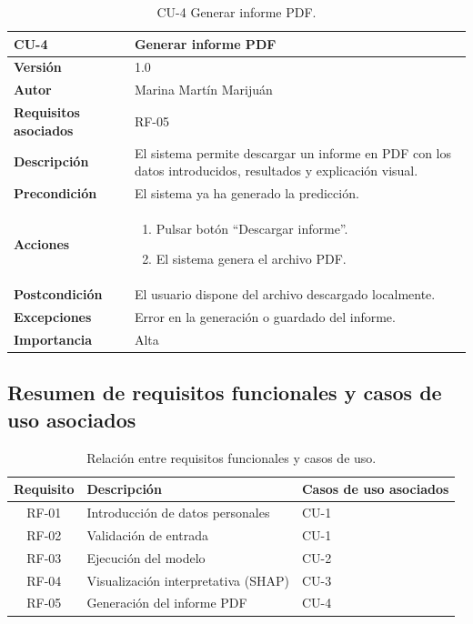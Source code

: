 \begin{table}[!htbp]
	\centering
	\begin{tabularx}{\linewidth}{ p{} p{} }
		\toprule
		\textbf{CU-4}    & Generar informe PDF \\
		\toprule
		\textbf{Versión}              & 1.0    \\
		\textbf{Autor}                & Marina Martín Marijuán \\
		\textbf{Requisitos asociados} & RF-05 \\
		\textbf{Descripción}          & El sistema permite descargar un informe en PDF con los datos introducidos, resultados y explicación visual. \\
		\textbf{Precondición}         & El sistema ya ha generado la predicción. \\
		\textbf{Acciones}             &
		\begin{enumerate}
			\item Pulsar botón “Descargar informe”.
			\item El sistema genera el archivo PDF.
		\end{enumerate}\\
		\textbf{Postcondición}        & El usuario dispone del archivo descargado localmente. \\
		\textbf{Excepciones}          & Error en la generación o guardado del informe. \\
		\textbf{Importancia}          & Alta \\
		\bottomrule
	\end{tabularx}
	\caption{CU-4 Generar informe PDF.}
\end{table}

\clearpage
\subsection{Resumen de requisitos funcionales y casos de uso asociados}

\begin{table}[H]
\centering
\begin{tabular}{|c|l|l|}
\hline
\textbf{Requisito} & \textbf{Descripción} & \textbf{Casos de uso asociados} \\
\hline
RF-01 & Introducción de datos personales & CU-1 \\
RF-02 & Validación de entrada & CU-1 \\
RF-03 & Ejecución del modelo & CU-2 \\
RF-04 & Visualización interpretativa (SHAP) & CU-3 \\
RF-05 & Generación del informe PDF & CU-4 \\
\hline
\end{tabular}
\caption{Relación entre requisitos funcionales y casos de uso.}
\label{tab:resumen-rf-cu}
\end{table}

